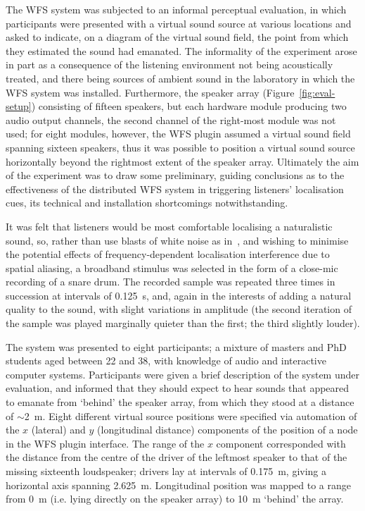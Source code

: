 \documentclass[utf8]{FrontiersinHarvard}
\newcommand{\figref}[1]{Figure~\ref{#1}}
\begin{document}
    The WFS system was subjected to an informal perceptual evaluation, in which
    participants were presented with a virtual sound source at various locations
    and asked to indicate, on a diagram of the virtual sound field, the point
    from which they estimated the sound had emanated.
    The informality of the experiment arose in part as a consequence of the
    listening environment not being acoustically treated, and there being sources
    of ambient sound in the laboratory in which the WFS system was installed.
    Furthermore, the speaker array (\figref{fig:eval-setup}) consisting of fifteen
    speakers, but each hardware module producing two audio output channels,
    the second channel of the right-most module was not used;
    for eight modules, however, the WFS plugin assumed a virtual sound field
    spanning sixteen speakers, thus it was possible to position a virtual sound
    source horizontally beyond the rightmost extent of the speaker array.
    Ultimately the aim of the experiment was to draw some preliminary, guiding
    conclusions as to the effectiveness of the distributed WFS system in
    triggering listeners' localisation cues, its technical and installation
    shortcomings notwithstanding.

    It was felt that listeners would be most comfortable localising a naturalistic
    sound, so, rather than use blasts of white noise as
    in~\citep[ch.~6]{verheijen_sound_1998}, and wishing to minimise the potential
    effects of frequency-dependent localisation interference due to spatial
    aliasing, a broadband stimulus was selected in the form of a close-mic recording
    of a snare drum.
    The recorded sample was repeated three times in succession at intervals of
    \qty{.125}{\s}, and, again in the interests of adding a natural quality to the
    sound, with slight variations in amplitude (the second iteration of the sample
    was played marginally quieter than the first; the third slightly louder).

    The system was presented to eight participants; a mixture of masters and PhD
    students aged between 22 and 38, with knowledge of audio and interactive
    computer systems.
    Participants were given a brief description of the system under evaluation,
    and informed that they should expect to hear sounds that appeared to emanate
    from `behind' the speaker array, from which they stood at a distance of
    $\sim$\qty{2}{\m}.
    Eight different virtual source positions were specified via automation of the
    $x$ (lateral) and $y$ (longitudinal distance) components of the position of a
    node in the WFS plugin interface.
    The range of the $x$ component corresponded with the distance from the centre of
    the driver of the leftmost speaker to that of the missing sixteenth loudspeaker;
    drivers lay at intervals of \qty{.175}{\m}, giving a horizontal axis spanning
    \qty{2.625}{\m}.
    Longitudinal position was mapped to a range from \qty{0}{\m} (i.e. lying
    directly on the speaker array) to \qty{10}{\m} `behind' the array.
\end{document}
